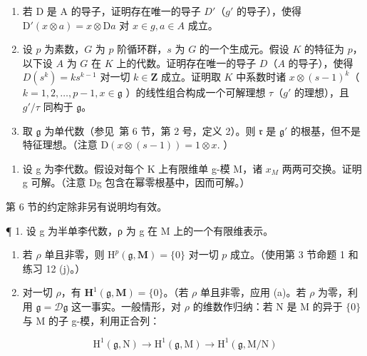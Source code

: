 \begin{enumerate}
\def\labelenumi{(\alph{enumi})}
\item
  若 D 是 A 的导子，证明存在唯一的导子 \(D'\)（\(g'\) 的导子），使得 \(\mathrm{D}'(x \otimes a) = x \otimes \mathrm{D}a\) 对 \(x \in g, a \in A\) 成立。
\item
  设 \(p\) 为素数，\(G\) 为 \(p\) 阶循环群，\(s\) 为 \(G\) 的一个生成元。假设 \(K\) 的特征为 \(p\)，以下设 \(A\) 为 \(G\) 在 \(K\) 上的代数。证明存在唯一的导子 \(D\)（\(A\) 的导子），使得 \(D(s^k) = ks^{k-1}\) 对一切 \(k \in \mathbf{Z}\) 成立。证明取 \(K\) 中系数时诸 \(x \otimes (s - 1)^k\)（ \(k = 1, 2, \ldots, p - 1, x \in \mathfrak{g}\) ）的线性组合构成一个可解理想 \(\tau\)（\(g'\) 的理想），且 \(g'/\tau\) 同构于 \(\mathfrak{g}\)。
\item
  取 \(\mathfrak{g}\) 为单代数（参见~第 6 节，第 2 号，定义 2）。则 \(\mathfrak{r}\) 是 \(\mathfrak{g}'\) 的根基，但不是特征理想。（注意 \(\mathrm{D}(x\otimes (s - 1)) = 1\otimes x.\) ）
\end{enumerate}

\begin{enumerate}
\def\labelenumi{\arabic{enumi}.}
\setcounter{enumi}{16}
\tightlist
\item
  设 g 为李代数。假设对每个 K 上有限维单 g-模 M，诸 \(x_{M}\) 两两可交换。证明 g 可解。（注意 Dg 包含在幂零根基中，因而可解。）
\end{enumerate}


第 6 节的约定除非另有说明均有效。

¶ 1. 设 g 为半单李代数，ρ 为 g 在 M 上的一个有限维表示。

\begin{enumerate}
\def\labelenumi{(\alph{enumi})}
\item
  若 \(\rho\) 单且非零，则 \(\mathrm{H}^p (\mathfrak{g},\mathbf{M}) = \{0\}\) 对一切 \(p\) 成立。（使用第 3 节命题 1 和练习 12 (j)。）
\item
  对一切 \(\rho\)，有 \(\mathbf{H}^1(\mathfrak{g}, \mathbf{M}) = \{0\}\)。（若 \(\rho\) 单且非零，应用 (a)。若 \(\rho\) 为零，利用 \(\mathfrak{g} = \mathcal{D}\mathfrak{g}\) 这一事实。一般情形，对 \(\rho\) 的维数作归纳：若 N 是 M 的异于 \(\{0\}\) 与 M 的子 g-模，利用正合列：
\end{enumerate}

\[
\mathrm{H} ^ {1} (\mathfrak {g}, \mathrm{N}) \rightarrow \mathrm{H} ^ {1} (\mathfrak {g}, \mathrm{M}) \rightarrow \mathrm{H} ^ {1} (\mathfrak {g}, \mathrm{M} / \mathrm{N})
\]

